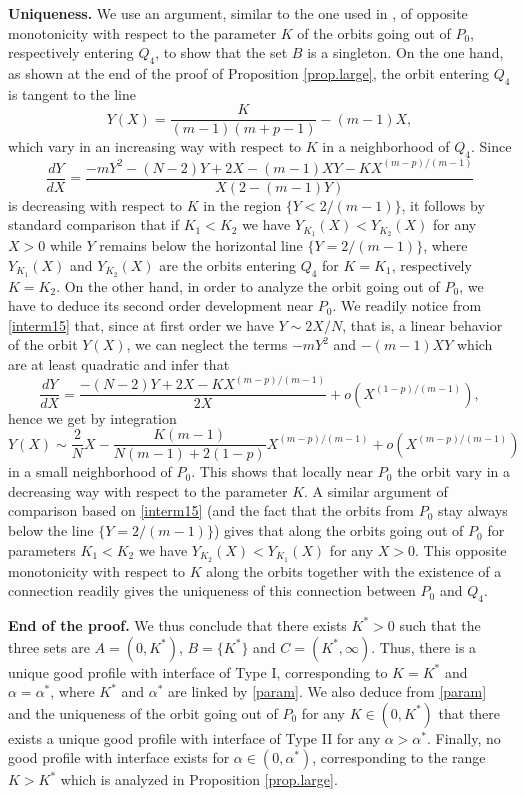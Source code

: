 \documentclass[a4paper,11pt]{article}
\numberwithin{equation}{section}
\begin{document}
\noindent \textbf{Uniqueness.} We use an argument, similar to the one used in \cite{dPS00}, of opposite monotonicity with respect to the parameter $K$ of the orbits going out of $P_0$, respectively entering $Q_4$, to show that the set $B$ is a singleton. On the one hand, as shown at the end of the proof of Proposition \ref{prop.large}, the orbit entering $Q_4$ is tangent to the line
$$
Y(X)=\frac{K}{(m-1)(m+p-1)}-(m-1)X,
$$
which vary in an increasing way with respect to $K$ in a neighborhood of $Q_4$. Since
\begin{equation}\label{interm15}
\frac{dY}{dX}=\frac{-mY^2-(N-2)Y+2X-(m-1)XY-KX^{(m-p)/(m-1)}}{X(2-(m-1)Y)}
\end{equation}
is decreasing with respect to $K$ in the region $\{Y<2/(m-1)\}$, it follows by standard comparison that if $K_1<K_2$ we have $Y_{K_1}(X)<Y_{K_2}(X)$ for any $X>0$ while $Y$ remains below the horizontal line $\{Y=2/(m-1)\}$, where $Y_{K_1}(X)$ and $Y_{K_2}(X)$ are the orbits entering $Q_4$ for $K=K_1$, respectively $K=K_2$. On the other hand, in order to analyze the orbit going out of $P_0$, we have to deduce its second order development near $P_0$. We readily notice from \eqref{interm15} that, since at first order we have $Y\sim 2X/N$, that is, a linear behavior of the orbit $Y(X)$, we can neglect the terms $-mY^2$ and $-(m-1)XY$ which are at least quadratic and infer that
$$
\frac{dY}{dX}=\frac{-(N-2)Y+2X-KX^{(m-p)/(m-1)}}{2X}+o(X^{(1-p)/(m-1)}),
$$
hence we get by integration
$$
Y(X)\sim\frac{2}{N}X-\frac{K(m-1)}{N(m-1)+2(1-p)}X^{(m-p)/(m-1)}+o(X^{(m-p)/(m-1)})
$$
in a small neighborhood of $P_0$. This shows that locally near $P_0$ the orbit vary in a decreasing way with respect to the parameter $K$. A similar argument of comparison based on \eqref{interm15} (and the fact that the orbits from $P_0$ stay always below the line $\{Y=2/(m-1)\}$) gives that along the orbits going out of $P_0$ for parameters $K_1<K_2$ we have $Y_{K_2}(X)<Y_{K_1}(X)$ for any $X>0$. This opposite monotonicity with respect to $K$ along the orbits together with the existence of a connection readily gives the uniqueness of this connection between $P_0$ and $Q_4$.

\medskip

\noindent \textbf{End of the proof.} We thus conclude that there exists $K^*>0$ such that the three sets are $A=(0,K^*)$, $B=\{K^*\}$ and $C=(K^*,\infty)$. Thus, there is a unique good profile with interface of Type I, corresponding to $K=K^*$ and $\alpha=\alpha^*$, where $K^*$ and $\alpha^*$ are linked by \eqref{param}. We also deduce from \eqref{param} and the uniqueness of the orbit going out of $P_0$ for any $K\in(0,K^*)$ that there exists a unique good profile with interface of Type II for any $\alpha>\alpha^*$. Finally, no good profile with interface exists for $\alpha\in(0,\alpha^*)$, corresponding to the range $K>K^*$ which is analyzed in Proposition \ref{prop.large}.
\end{document}
